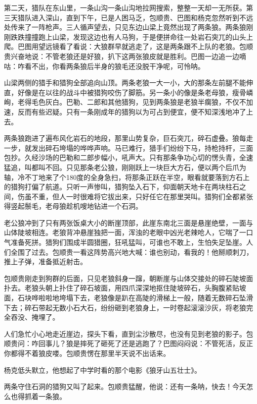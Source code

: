 \par 
\par 第二天，猎队在东山里，一条山沟一条山沟地拉网搜索，整整一天却一无所获。第三天猎队进入深山，直到下午，已是人困马乏，包顺贵、巴图和杨克忽然听到不远处传来了一阵枪声。三人循声望去，只见东边山梁上竟然出现了两条狼。两条狼刚刚跌跌撞撞跑上山梁，发现这边也有人马狗，于是便拼命往一处岩石突兀的山头上爬。巴图用望远镜看了看说：大狼群早就逃走了，这是两条跟不上队的老狼。包顺贵兴奋地说：不管老狼还是好狼，扒下这两张狼皮就是胜利。巴图一边追一边嘀咕：咋看不出，你看两条狼后半身的狼毛还没脱干净呢，可怜呐。
\par 山梁两侧的猎手和猎狗全部追向山顶。两条老狼一大一小，大的那条左前腿不能伸直，好像是在以往的战斗中被猎狗咬伤了脚筋。另一条小的像是条老母狼，瘦骨嶙峋，老得毛色灰白。巴勒、二郎和其他猎狗，见到两条狼是老狼半瘸狼，不仅不加速，反而有些迟疑。只有一条刚成年的猎狗以为可占到便宜，便不知深浅地冲了上去。
\par 两条狼跑进了遍布风化岩石的地段，那里山势复杂，巨石突兀，碎石虚叠。狼每走一步，就发出碎石垮塌的哗哗声响。马已难行，猎手们纷纷下马，持枪持杆，三面包抄。久经沙场的巴勒和二郎步幅小，吼声大。只有那条争功心切的愣头青，全速猛追，叫都叫不回。只见那条老公狼，刚刚跃上一块巨大方石，便以两个后爪为轴，冷不丁地来了个180度的全身急扫，将那条正跃在半空，眼看就要落到方石上的猎狗打偏了航道。只听一声惨叫，猎狗坠入石下，仰面朝天地卡在两块柱石之间，伤虽不重，但人一时很难将它拔出来，只好任它在那里哭叫。猎狗们全都紧张得竖起鬃毛，老母狼趁机嗖地钻进一个石洞。
\par 老公狼冲到了只有两张饭桌大小的断崖顶部，此崖东南北三面是悬崖绝壁，一面与山体陡坡相连。老狼背冲悬崖独把一面，浑浊的老眼中凶光老辣呛人，它喘了一口气准备死拼。猎狗们围成半圆猎圈，狂吼猛叫，可谁也不敢上，生怕失足坠崖。人们全围了过去。包顺贵一看这阵势高兴地大喊：谁也别动，看我的！他掰顺刺刀，推上子弹，准备抵近射击。
\par 包顺贵刚走到狗群的后面，只见老狼斜身一蹿，朝断崖与山体交接处的碎石陡坡面扑去。老狼头朝上扑住了碎石坡面，用四爪深深地抠住陡坡碎石，头胸腹紧贴坡面，石块哗啦啦地垮塌下去，老狼像是趴在高陡的滑梯上一般，随着无数碎石坠滑下去；碎石带起无数小石大石，纷纷砸到老狼身上，一时卷起滚滚沙灰，将老狼完全吞没、掩埋了。
\par 人们急忙小心地走近崖边，探头下看，直到尘沙散尽，也没有见到老狼的影子。包顺贵问：咋回事儿？狼是摔死了砸死了还是逃跑了？巴图闷闷说：不管死活，反正你都得不着狼皮喽。包顺贵愣在那里半天说不出话来。
\par 杨克低头默立，他想起了中学时看的那个电影《狼牙山五壮士》。
\par 两条守住石洞的猎狗又叫了起来。包顺贵猛醒，他说：还有一条呐，快去！今天怎么也得抓着一条狼。
